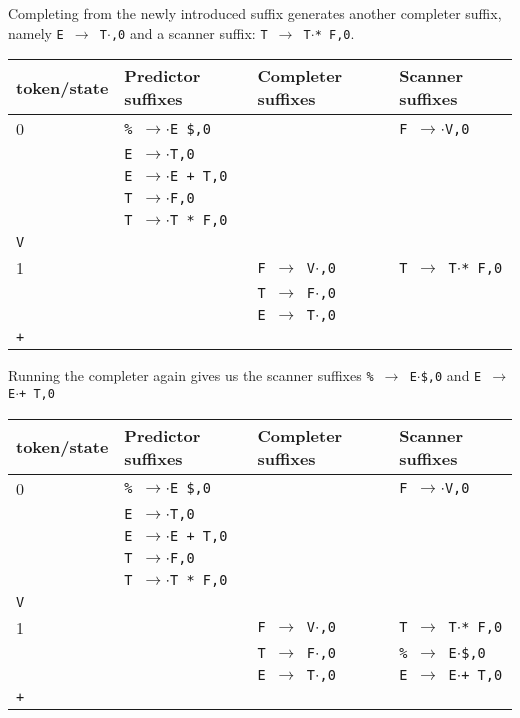 \documentclass[11pt]{article}
\def\ra{\rightarrow}
\begin{document}
Completing from the newly introduced suffix generates another completer
suffix, namely \texttt{E $\ra$ T$\cdot$,0} and a scanner suffix: 
\texttt{T $\ra$ T$\cdot$* F,0}.

\begin{tabular}{|l|l|l|l|}
\hline
token/state & Predictor suffixes & Completer suffixes & Scanner suffixes\\
\hline
0     & \texttt{\% $\ra$$\cdot$E \$,0} & & \texttt{F $\ra$$\cdot$V,0}\\
      & \texttt{E $\ra$$\cdot$T,0} & & \\
      & \texttt{E $\ra$$\cdot$E + T,0} & & \\
      & \texttt{T $\ra$$\cdot$F,0} & & \\
      & \texttt{T $\ra$$\cdot$T * F,0} & & \\
\hline
\texttt{V} &  & &\\
\hline
1     &  & \texttt{F $\ra$ V$\cdot$,0}& \texttt{T $\ra$ T$\cdot$* F,0}\\
      &  & \texttt{T $\ra$ F$\cdot$,0}& \\
      &  & \texttt{E $\ra$ T$\cdot$,0}& \\
\hline
\texttt{+} &  & &\\
\hline
\end{tabular}

Running the completer again gives us the scanner suffixes \texttt{\%
  $\ra$ E$\cdot$\$,0} and \texttt{E $\ra$ E$\cdot$+ T,0}

\begin{tabular}{|l|l|l|l|}
\hline
token/state & Predictor suffixes & Completer suffixes & Scanner suffixes\\
\hline
0     & \texttt{\% $\ra$$\cdot$E \$,0} & & \texttt{F $\ra$$\cdot$V,0}\\
      & \texttt{E $\ra$$\cdot$T,0} & & \\
      & \texttt{E $\ra$$\cdot$E + T,0} & & \\
      & \texttt{T $\ra$$\cdot$F,0} & & \\
      & \texttt{T $\ra$$\cdot$T * F,0} & & \\
\hline
\texttt{V} &  & &\\
\hline
1     &  & \texttt{F $\ra$ V$\cdot$,0}& \texttt{T $\ra$ T$\cdot$* F,0}\\
      &  & \texttt{T $\ra$ F$\cdot$,0}& \texttt{\% $\ra$ E$\cdot$\$,0}\\
      &  & \texttt{E $\ra$ T$\cdot$,0}& \texttt{E $\ra$ E$\cdot$+ T,0}\\
\hline
\texttt{+} &  & &\\
\hline
\end{tabular}
\end{document}
